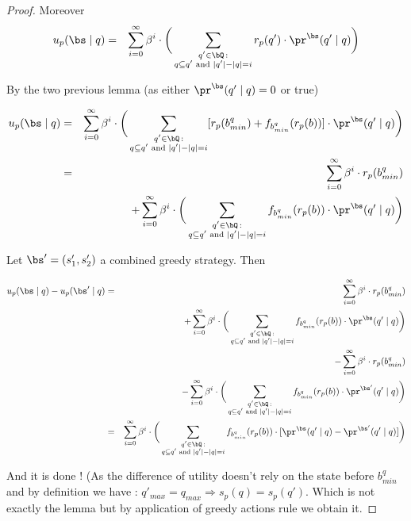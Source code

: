 \begin{proof}
Moreover
\begin{eqnarray*}
	u_p(\bs \mid q) & = & \sum_{i=0}^{\infty}\beta^{i} \cdot  \bigg(\sum_{\substack{q' \in \bQ \,: \\ q \subseteq q' \text{ {\rm and} } |q'| - |q| = i}} r_p(q') \cdot 
	\pr^{\bs}(q' \mid q)\bigg)
\end{eqnarray*}

By the two previous lemma (as either $\pr^{\bs}(q' \mid q) = 0$ or true) 

\begin{eqnarray*}
	u_p(\bs \mid q) & = & \sum_{i=0}^{\infty}\beta^{i} \cdot  \bigg(\sum_{\substack{q' \in \bQ \,: \\ q \subseteq q' \text{ {\rm and} } |q'| - |q| = i}} [r_p(b^q_{min}) + f_{b^q_{min}}(r_p(b))] \cdot 
	\pr^{\bs}(q' \mid q)\bigg) \\ 
	& = & \sum_{i=0}^{\infty}\beta^{i} \cdot  r_p(b^q_{min})  \\ 
	&&+ \sum_{i=0}^{\infty}\beta^{i} \cdot  \bigg(\sum_{\substack{q' \in \bQ \,: \\ q \subseteq q' \text{ {\rm and} } |q'| - |q| = i}}  f_{b^q_{min}}(r_p(b)) \cdot 
	\pr^{\bs}(q' \mid q)\bigg) \\ 
\end{eqnarray*}

Let $\bs' = (s_1',s_2')$ a combined greedy strategy. 
Then 

\begin{eqnarray*}
	u_p(\bs \mid q) - u_p(\bs' \mid q)& = & \sum_{i=0}^{\infty}\beta^{i} \cdot  r_p(b^q_{min})  \\ 
	&&+ \sum_{i=0}^{\infty}\beta^{i} \cdot  \bigg(\sum_{\substack{q' \in \bQ \,: \\ q \subseteq q' \text{ {\rm and} } |q'| - |q| = i}}  f_{b^q_{min}}(r_p(b)) \cdot 
	\pr^{\bs}(q' \mid q)\bigg) \\ 
	&& -  \sum_{i=0}^{\infty}\beta^{i} \cdot  r_p(b^q_{min})  \\ 
	&& - \sum_{i=0}^{\infty}\beta^{i} \cdot  \bigg(\sum_{\substack{q' \in \bQ \,: \\ q \subseteq q' \text{ {\rm and} } |q'| - |q| = i}}  f_{b^q_{min}}(r_p(b)) \cdot 
	\pr^{\bs'}(q' \mid q)\bigg) \\ 	
	& = & \sum_{i=0}^{\infty}\beta^{i} \cdot  \bigg(\sum_{\substack{q' \in \bQ \,: \\ q \subseteq q' \text{ {\rm and} } |q'| - |q| = i}} f_{b^q_{min}}(r_p(b)) \cdot 
	[\pr^{\bs}(q' \mid q)-\pr^{\bs'}(q' \mid q)]\bigg) \\
\end{eqnarray*}

And it is done ! (As the difference of utility doesn't rely on the state before $b^q_{min}$ and by definition we have : 
$q'_{max} = q_{max} \Rightarrow s_p(q) = s_p(q')$. Which is not exactly the lemma but by application of greedy actions rule we obtain it.

\end{proof}

